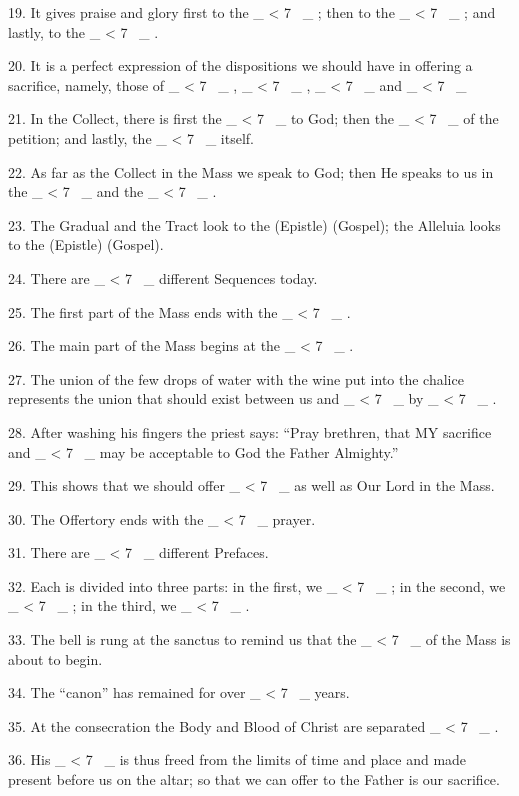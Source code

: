 \documentclass[a4paper,14pt]{memoir}
\newcommand\textjarman[1]{{\jarman #1}}
\newcounter{z}
\newcommand\spaces[1]{ \_\loop \ifnum\value{z} < #1
~\_%
\stepcounter{z}%
\repeat%
\setcounter{z}{0}}
\begin{document}
19.  It  gives  praise  and  glory  first  to  the
\spaces{7}; then to the \spaces{7}; and lastly, to the \spaces{7}.  

20.  It  is  a
perfect expression  of  the  dispositions  we  should  have  in  offering  a
sacrifice, namely, those of \spaces{7}, \spaces{7}, \spaces{7}  and  \spaces{7}  

21.
In the Collect, there is first the \spaces{7} to God;  then  the  \spaces{7}  of
the petition; and lastly, the \spaces{7} itself. 

22. As far as the Collect  in
the Mass we speak to God; then He speaks to  us  in  the  \spaces{7}  and  the
\spaces{7}. 

23. The Gradual and the Tract look to the (\textjarman{Epistle}) (\textjarman{Gospel});  the
Alleluia looks to the (\textjarman{Epistle}) (\textjarman{Gospel}). 

24. There are  \spaces{7}  different
Sequences today. 

25. The first part of the Mass ends with the \spaces{7}.  

26.
The main part of the Mass begins at the \spaces{7}. 

27. The union of  the  few
drops of water with the wine put into the chalice represents the union  that
should exist between us and \spaces{7} by  \spaces{7}.  

28.  After  washing  his
fingers the priest says: “Pray brethren, that MY sacrifice and \spaces{7}  may
be acceptable to God the Father Almighty.” 

29. This  shows  that  we  should
offer \spaces{7} as well as Our Lord in the Mass. 

30. The Offertory ends  with
the \spaces{7} prayer. 

31. There are \spaces{7} different Prefaces. 

32. Each  is
divided into three parts: in the first,  we  \spaces{7};  in  the  second,  we
\spaces{7}; in the third, we \spaces{7}. 

33. The bell is rung at the sanctus  to
remind us that the \spaces{7} of the Mass is about to begin. 

34.  The  “canon”
has remained for over \spaces{7} years. 

35. At the consecration the  Body  and
Blood of Christ are separated \spaces{7}. 

36. His \spaces{7} is thus freed  from
the limits of time and place and made present before us  on  the  altar;  so
that we can offer to the Father is our sacrifice. 
\end{document}

